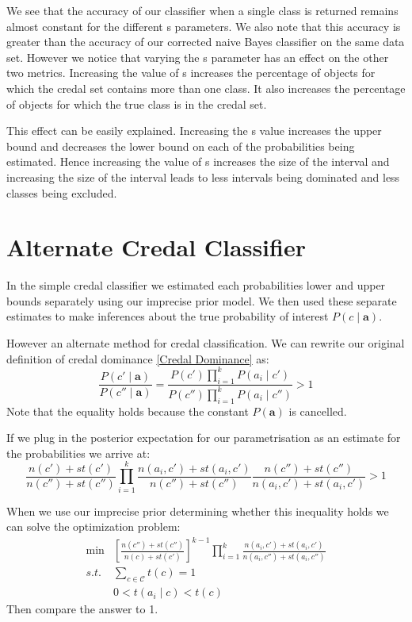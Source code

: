 We see that the accuracy of our classifier when a single class is returned remains almost constant for the different s parameters.
We also note that this accuracy is greater than the accuracy of our corrected naive Bayes classifier on the same data set.
However we notice that varying the s parameter has an effect on the other two metrics.
Increasing the value of s increases the percentage of objects for which the credal set contains more than one class.
It also increases the percentage of objects for which the true class is in the credal set.

This effect can be easily explained.
Increasing the s value increases the upper bound and decreases the lower bound on each of the probabilities being estimated.
Hence increasing the value of s increases the size of the interval and increasing the size of the interval leads to less intervals being dominated and less classes being excluded.

\section{Alternate Credal Classifier}
In the simple credal classifier we estimated each probabilities lower and upper bounds separately using our imprecise prior model.
We then used these separate estimates to make inferences about the true probability of interest $P(c \mid \mathbf{a})$.

However an alternate method for credal classification.
We can rewrite our original definition of credal dominance \cref{Credal Dominance} as:
\begin{equation}
	\frac{P(c' \mid \mathbf{a})}{P(c'' \mid \mathbf{a})} = \frac{P(c')\prod_{i=1}^{k}P(a_i \mid c')}{P(c'')\prod_{i=1}^{k}P(a_i \mid c'')} > 1
\end{equation}
Note that the equality holds because the constant $P(\mathbf{a})$ is cancelled.

If we plug in the posterior expectation for our parametrisation as an estimate for the probabilities we arrive at:
\begin{equation}
	\frac{n(c')+st(c')}{n(c'')+st(c'')} \prod_{i=1}^k \frac{n(a_i, c') + st(a_i , c')}{n(c'') + st(c'')} \frac{n(c'') + st(c'')}{n(a_i, c') + st(a_i , c')} > 1
\end{equation}

When we use our imprecise prior determining whether this inequality holds we can solve the optimization problem:
\begin{align}
	\min & \left[ \frac{n(c'')+st(c'')}{n(c)+st(c')} \right]^{k-1} \prod_{i=1}^k \frac{n(a_i, c') + st(a_i , c')}{n(a_i, c'') + st(a_i , c'')} \\
	s.t. & \sum_{c \in \mathcal{C}} t(c) = 1 \\
	& 0 < t(a_i \mid c) < t(c)
\end{align}
Then compare the answer to 1.